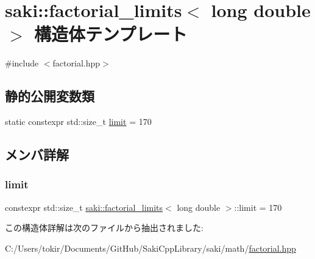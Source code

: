 \hypertarget{structsaki_1_1factorial__limits_3_01long_01double_01_4}{}\section{saki\+:\+:factorial\+\_\+limits$<$ long double $>$ 構造体テンプレート}
\label{structsaki_1_1factorial__limits_3_01long_01double_01_4}


{\ttfamily \#include $<$factorial.\+hpp$>$}

\subsection*{静的公開変数類}
\begin{DoxyCompactItemize}
\item 
static constexpr std\+::size\+\_\+t \mbox{\hyperlink{structsaki_1_1factorial__limits_3_01long_01double_01_4_af06336d197e4c91b6e423da5f8a03db2}{limit}} = 170
\end{DoxyCompactItemize}


\subsection{メンバ詳解}
\mbox{\label{structsaki_1_1factorial__limits_3_01long_01double_01_4_af06336d197e4c91b6e423da5f8a03db2}} 
\subsubsection{\texorpdfstring{limit}{limit}}
{\footnotesize\ttfamily constexpr std\+::size\+\_\+t \mbox{\hyperlink{structsaki_1_1factorial__limits}{saki\+::factorial\+\_\+limits}}$<$ long double $>$\+::limit = 170\hspace{0.3cm}{\ttfamily [static]}}



この構造体詳解は次のファイルから抽出されました\+:\begin{DoxyCompactItemize}
\item 
C\+:/\+Users/tokir/\+Documents/\+Git\+Hub/\+Saki\+Cpp\+Library/saki/math/\mbox{\hyperlink{factorial_8hpp}{factorial.\+hpp}}\end{DoxyCompactItemize}
